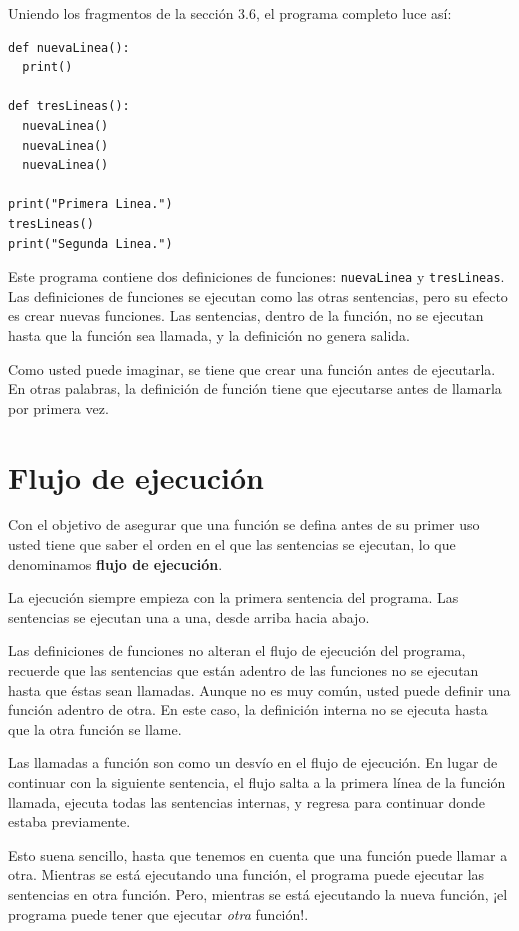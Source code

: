 Uniendo los fragmentos de la sección 3.6, el programa completo luce
así:

\begin{lstlisting}
def nuevaLinea():
  print()

def tresLineas():
  nuevaLinea()
  nuevaLinea()
  nuevaLinea()

print("Primera Linea.")
tresLineas()
print("Segunda Linea.")
\end{lstlisting}
 Este programa contiene dos definiciones de funciones: \texttt{nuevaLinea}
y \texttt{tresLineas}. Las definiciones de funciones se ejecutan como
las otras sentencias, pero su efecto es crear nuevas funciones. Las
sentencias, dentro de la función, no se ejecutan hasta que la función
sea llamada, y la definición no genera salida.

Como usted puede imaginar, se tiene que crear una función antes de
ejecutarla. En otras palabras, la definición de función tiene que
ejecutarse antes de llamarla por primera vez.

\section{Flujo de ejecución}


Con el objetivo de asegurar que una función se defina antes de su
primer uso usted tiene que saber el orden en el que las sentencias
se ejecutan, lo que denominamos \textbf{flujo de ejecución}.

La ejecución siempre empieza con la primera sentencia del programa.
Las sentencias se ejecutan una a una, desde arriba hacia abajo.

Las definiciones de funciones no alteran el flujo de ejecución del
programa, recuerde que las sentencias que están adentro de las funciones
no se ejecutan hasta que éstas sean llamadas. Aunque no es muy común,
usted puede definir una función adentro de otra. En este caso, la
definición interna no se ejecuta hasta que la otra función se llame.

Las llamadas a función son como un desvío en el flujo de ejecución.
En lugar de continuar con la siguiente sentencia, el flujo salta a
la primera línea de la función llamada, ejecuta todas las sentencias
internas, y regresa para continuar donde estaba previamente.

Esto suena sencillo, hasta que tenemos en cuenta que una función puede
llamar a otra. Mientras se está ejecutando una función, el programa
puede ejecutar las sentencias en otra función. Pero, mientras se está
ejecutando la nueva función, ¡el programa puede tener que ejecutar
\textit{otra} función!.

